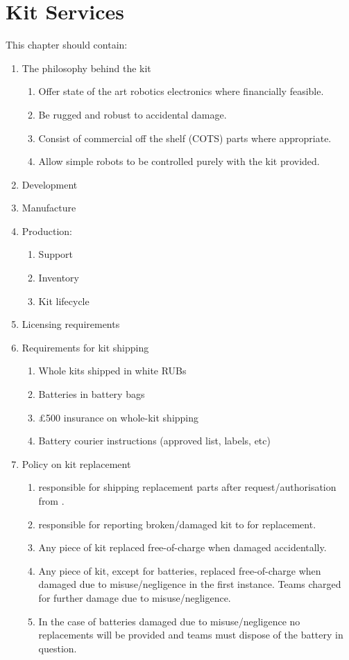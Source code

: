 \section{Kit Services}

This chapter should contain:
\begin{enumerate}
\item The philosophy behind the kit
  \begin{enumerate}
    \item{Offer state of the art robotics electronics where financially feasible.}
    \item{Be rugged and robust to accidental damage.}
    \item{Consist of commercial off the shelf (COTS) parts where appropriate.}
    \item{Allow simple robots to be controlled purely with the kit provided.}
  \end{enumerate}
\item Development
\item Manufacture
\item Production:
  \begin{enumerate}
  \item Support
  \item Inventory
  \item Kit lifecycle
  \end{enumerate}
\item Licensing requirements

\item Requirements for kit shipping
  \begin{enumerate}
    \item{Whole kits shipped in white RUBs}
    \item{Batteries in battery bags}
    \item{\pounds500 insurance on whole-kit shipping}
    \item{Battery courier instructions (approved list, labels, etc)}
  \end{enumerate}
\item Policy on kit replacement
  \begin{enumerate}
    \item{ responsible for shipping replacement parts after request/authorisation from .}
    \item{ responsible for reporting broken/damaged kit to  for replacement.}
    \item{Any piece of kit replaced free-of-charge when damaged accidentally.}
    \item{Any piece of kit, except for batteries, replaced free-of-charge when damaged due to misuse/negligence in the first instance. Teams charged for further damage due to misuse/negligence.}
    \item{In the case of batteries damaged due to misuse/negligence no replacements will be provided and teams must dispose of the battery in question.}
  \end{enumerate}

\end{enumerate}
